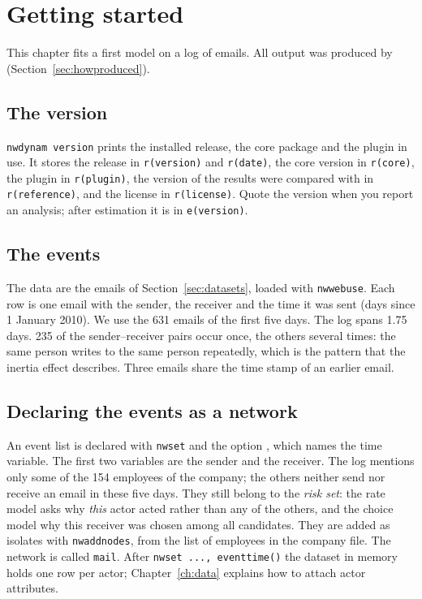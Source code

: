 \chapter{Getting started}\label{ch:start}

This chapter fits a first model on a log of emails. All output was produced by  (Section~\ref{sec:howproduced}).

\section{The version}

\texttt{nwdynam version} prints the installed release, the core package and the plugin in use. It stores the release in \texttt{r(version)} and \texttt{r(date)}, the core version in \texttt{r(core)}, the plugin in \texttt{r(plugin)}, the version of \goldfish{} the results were compared with in \texttt{r(reference)}, and the license in \texttt{r(license)}. Quote the version when you report an analysis; after estimation it is in \texttt{e(version)}.

\section{The events}

The data are the emails of Section~\ref{sec:datasets}, loaded with \texttt{nwwebuse}. Each row is one email with the sender, the receiver and the time it was sent (days since 1 January 2010). We use the 631 emails of the first five days.
The log spans 1.75 days. 235 of the sender--receiver pairs occur once, the others several times: the same person writes to the same person repeatedly, which is the pattern that the inertia effect describes. Three emails share the time stamp of an earlier email.

\section{Declaring the events as a network}\label{sec:isolates}

An event list is declared with \texttt{nwset} and the option , which names the time variable. The first two variables are the sender and the receiver. The log mentions only some of the 154 employees of the company; the others neither send nor receive an email in these five days. They still belong to the \emph{risk set}: the rate model asks why \emph{this} actor acted rather than any of the others, and the choice model why this receiver was chosen among all candidates. They are added as isolates with \texttt{nwaddnodes}, from the list of employees in the company file.
The network is called \texttt{mail}. After \texttt{nwset ..., eventtime()} the dataset in memory holds one row per actor; Chapter~\ref{ch:data} explains how to attach actor attributes.

